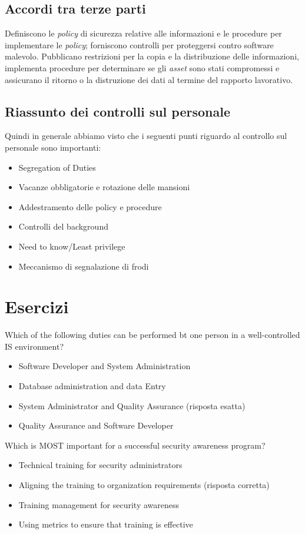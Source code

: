 \subsection{Accordi tra terze parti}

Definiscono le \textit{policy} di sicurezza relative alle informazioni e le 
procedure per implementare le \textit{policy}; forniscono controlli per 
proteggersi contro software malevolo. Pubblicano restrizioni per la copia e la 
distribuzione delle informazioni, implementa procedure per determinare se gli 
\textit{asset} sono stati compromessi e assicurano il ritorno o la distruzione 
dei dati al termine del rapporto lavorativo.

\subsection{Riassunto dei controlli sul personale}

Quindi in generale abbiamo visto che i seguenti punti riguardo al controllo sul 
personale sono importanti:
\begin{itemize}
\item Segregation of Duties
\item Vacanze obbligatorie e rotazione delle mansioni
\item Addestramento delle policy e procedure
\item Controlli del background
\item Need to know/Least privilege
\item Meccanismo di segnalazione di frodi 
\end{itemize}

\section{Esercizi}

Which of the following duties can be performed bt one person in a 
well-controlled IS environment?
\begin{itemize}
\item Software Developer and System Administration
\item Database administration and data Entry
\item System Administrator and Quality Assurance (risposta esatta)
\item Quality Assurance and Software Developer
\end{itemize}


Which is MOST important for a successful security awareness program?
\begin{itemize}
\item Technical training for security administrators
\item Aligning the training to organization requirements (risposta corretta)
\item Training management for security awareness
\item Using metrics to ensure that training is effective
\end{itemize}


